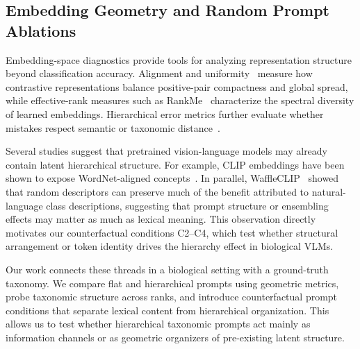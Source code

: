 \subsection{Embedding Geometry and Random Prompt Ablations}

Embedding-space diagnostics provide tools for analyzing representation structure beyond classification accuracy. Alignment and uniformity~\cite{wang2020understanding} measure how contrastive representations balance positive-pair compactness and global spread, while effective-rank measures such as RankMe~\cite{garrido2023rankme} characterize the spectral diversity of learned embeddings. Hierarchical error metrics further evaluate whether mistakes respect semantic or taxonomic distance~\cite{bertinetto2020mistakes}.

Several studies suggest that pretrained vision-language models may already contain latent hierarchical structure. For example, CLIP embeddings have been shown to expose WordNet-aligned concepts~\cite{bertucci2024concept}. In parallel, WaffleCLIP~\cite{roth2023waffling} showed that random descriptors can preserve much of the benefit attributed to natural-language class descriptions, suggesting that prompt structure or ensembling effects may matter as much as lexical meaning. This observation directly motivates our counterfactual conditions C2--C4, which test whether structural arrangement or token identity drives the hierarchy effect in biological VLMs.

Our work connects these threads in a biological setting with a ground-truth taxonomy. We compare flat and hierarchical prompts using geometric metrics, probe taxonomic structure across ranks, and introduce counterfactual prompt conditions that separate lexical content from hierarchical organization. This allows us to test whether hierarchical taxonomic prompts act mainly as information channels or as geometric organizers of pre-existing latent structure.
